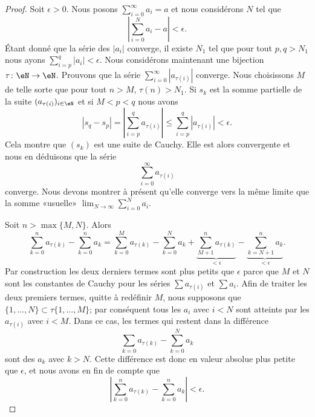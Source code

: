 \begin{proof}
	Soit \( \epsilon>0\). Nous posons \( \sum_{i=0}^\infty a_i=a\) et nous considérons \( N\) tel que
	\begin{equation}
		| \sum_{i=0}^Na_i-a |<\epsilon.
	\end{equation}
	Étant donné que la série des \( | a_i |\) converge, il existe \( N_1\) tel que pour tout \( p,q>N_1\) nous ayons \( \sum_{i=p}^q| a_i |<\epsilon\). Nous considérons maintenant une bijection \( \tau\colon \eN\to \eN \). Prouvons que la série \( \sum_{i=0}^{\infty}| a_{\tau(i)} |\) converge. Nous choisissons \( M\) de telle sorte que pour tout \( n>M\), \( \tau(n)>N_1\). Si \( s_k\) est la somme partielle de la suite \( ( a_{\tau(i)} )_{i\in \eN}\) et si \( M<p<q \) nous avons
	\begin{equation}
		| s_q-s_p |= | \sum_{i=p}^q a_{\tau(i)} | \leq \sum_{i=p}^q| a_{\tau(i)} |<\epsilon.
	\end{equation}
	Cela montre que \( (s_k)\) est une suite de Cauchy. Elle est alors convergente et nous en déduisons que la série
	\begin{equation}
		\sum_{i=0}^{\infty}a_{\tau(i)}
	\end{equation}
	converge. Nous devons montrer à présent qu'elle converge vers la même limite que la somme «usuelle» \( \lim_{N\to \infty} \sum_{i=0}^Na_i\).

	Soit \( n>\max\{ M,N \}\). Alors
	\begin{equation}
		\sum_{k=0}^na_{\tau(k)}-\sum_{k=0}^na_k=\sum_{k=0}^Ma_{\tau(k)}-\sum_{k=0}^Na_k+\underbrace{\sum_{M+1}^na_{\tau(k)}}_{<\epsilon}-\underbrace{\sum_{k=N+1}^na_k}_{<\epsilon}.
	\end{equation}
	Par construction les deux derniers termes sont plus petits que \( \epsilon\) parce que \( M\) et \( N\) sont les constantes de Cauchy pour les séries \( \sum a_{\tau(i)}\) et \( \sum a_i\). Afin de traiter les deux premiers termes, quitte à redéfinir \( M\), nous supposons que \( \{ 1,\ldots, N \}\subset \tau\{ 1,\ldots, M \}\); par conséquent tous les \( a_i\) avec \( i<N\) sont atteints par les \( a_{\tau(i)}\) avec \( i<M\). Dans ce cas, les termes qui restent dans la différence
	\begin{equation}
		\sum_{k=0}a_{\tau(k)}-\sum_{k=0}^Na_k
	\end{equation}
	sont des \( a_k\) avec \( k>N\). Cette différence est donc en valeur absolue plus petite que \( \epsilon\), et nous avons en fin de compte que
	\begin{equation}
		\left| \sum_{k=0}^na_{\tau(k)}-\sum_{k=0}^na_k \right| <\epsilon.
	\end{equation}
\end{proof}

